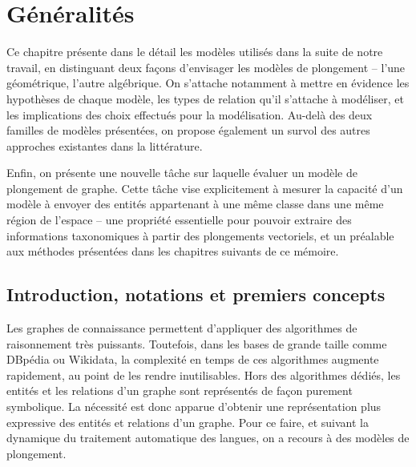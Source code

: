 \label{chap:kge}

\section{Généralités}
\label{sec:kge-general}




Ce chapitre présente dans le détail les modèles utilisés dans la suite de notre travail, en distinguant deux façons d'envisager les modèles de plongement – l'une géométrique, l'autre algébrique. On s'attache notamment à mettre en évidence les hypothèses de chaque modèle, les types de relation qu'il s'attache à modéliser, et les implications des choix effectués pour la modélisation. Au-delà des deux familles de modèles présentées, on propose également un survol des autres approches existantes dans la littérature.

Enfin, on présente une nouvelle tâche sur laquelle évaluer un modèle de plongement de graphe. Cette tâche vise explicitement à mesurer la capacité d'un modèle à envoyer des entités appartenant à une même classe dans une même région de l'espace – une propriété essentielle pour pouvoir extraire des informations taxonomiques à partir des plongements vectoriels, et un préalable aux méthodes présentées dans les chapitres suivants de ce mémoire.

\subsection{Introduction, notations et premiers concepts}
\label{subsec:kge-general-intro}

Les graphes de connaissance permettent d'appliquer des algorithmes de raisonnement très puissants. Toutefois, dans les bases de grande taille comme DBpédia ou Wikidata, la complexité en temps de ces algorithmes augmente rapidement, au point de les rendre inutilisables. Hors des algorithmes dédiés, les entités et les relations d'un graphe sont représentés de façon purement symbolique. La nécessité est donc apparue d'obtenir une représentation plus expressive des entités et relations d'un graphe. Pour ce faire, et suivant la dynamique du traitement automatique des langues, on a recours à des modèles de plongement. 


